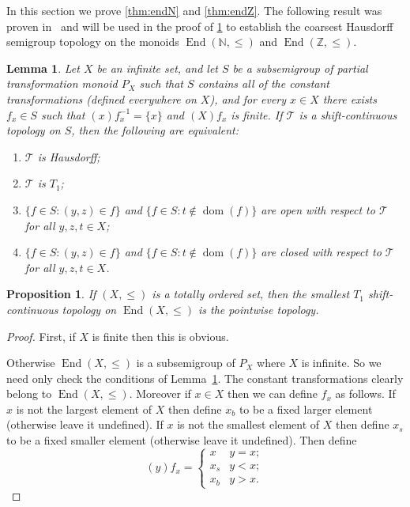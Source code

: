 \documentclass[11pt]{amsart}
\newtheorem{proposition}[theorem]{Proposition}
\newtheorem{lemma}[theorem]{Lemma}
\theoremstyle{definition}
\newcommand{\N}{\mathbb N}
\newcommand{\Zendd}{\operatorname{End}(\mathbb Z, \leq)}
\newcommand{\dom}{\operatorname{dom}}
\begin{document}
In this section we prove \cref{thm:endN} and \cref{thm:endZ}. %
The following result was proven in~\cite[Lemma 5.1]{main} and will be used in the proof of \cref{zariski_order} to establish the coarsest Hausdorff semigroup topology on the monoids 
\(\operatorname{End}(\N, \leq)\) and $\Zendd$.
\begin{lemma}
  \label{thm-elliott-1}
  Let $X$ be an infinite set, and let $S$ be a subsemigroup of partial transformation monoid $P_X$ such that
  $S$ contains all of the constant  transformations (defined everywhere on
  $X$), and for every $x\in X$
  there exists $f_{x}\in S$ such that $(x) f_{x} ^ {-1} = \{x\}$ and $(X)f_{x}$
  is finite.  If $\mathcal{T}$ is a shift-continuous topology on
  $S$, then the following are equivalent:
  \begin{enumerate}
    \item \label{thm-elliott-1-i} 
    $\mathcal{T}$ is Hausdorff;
    \item \label{thm-elliott-1-ii} 
    $\mathcal{T}$ is $T_1$;
    \item \label{thm-elliott-1-iii} 
    $\{f\in S: (y, z) \in f\}$ and $\{f \in S :
            t\not\in\dom(f)\}$ are open with respect to
          $\mathcal{T}$ for all $y, z, t \in X$;
    \item \label{thm-elliott-1-iv} 
    $\{f\in S: (y,z)\in f\}$ and $\{f \in S :
            t\not\in\dom(f)\}$ are closed with respect to
          $\mathcal{T}$ for all $y, z, t \in X$.
  \end{enumerate}
\end{lemma}



\begin{proposition}\label{zariski_order}
    If \((X, \leq)\) is a totally ordered set, then the smallest \(T_1\) shift-continuous topology on \(\operatorname{End}(X, \leq)\) is the pointwise topology. 
\end{proposition}
\begin{proof}
    First, if \(X\) is finite then this is obvious. 

    Otherwise  \(\operatorname{End}(X, \leq)\) is a subsemigroup of  \(P_X\) where \(X\) is infinite. So we need only check the conditions of Lemma~\ref{thm-elliott-1}. The constant transformations clearly belong to \(\operatorname{End}(X, \leq)\).
    Moreover if \(x\in X\) then we can define \(f_x\) as follows. If \(x\) is not the largest element of \(X\) then define \(x_b\) to be a fixed larger element (otherwise leave it undefined). If \(x\) is not the smallest element of \(X\) then define \(x_s\) to be a fixed smaller element (otherwise leave it undefined). Then define
    \[(y)f_x=\begin{cases}
        x &y=x;\\
        x_s & y<x;\\
        x_b & y>x.
    \end{cases}\]    
\end{proof}
\end{document}
